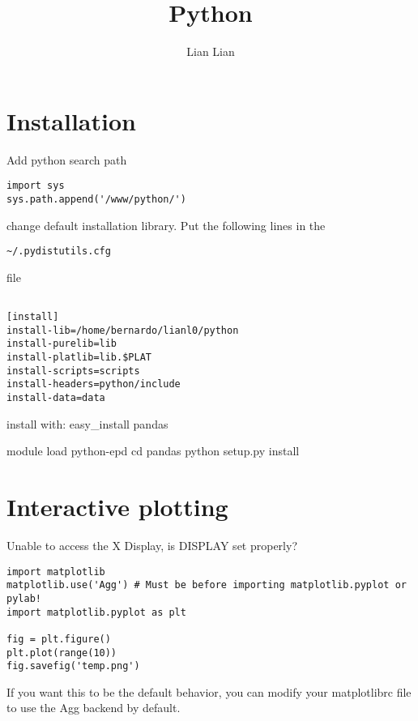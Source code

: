\documentclass[doc,12pt]{article}        %
\title{Python}
\author{Lian Lian}
\begin{document}
\maketitle
\tableofcontents
\section{Installation}
Add python search path
\begin{verbatim}
import sys
sys.path.append('/www/python/')
\end{verbatim}
change default installation library. Put the following lines in the \begin{verbatim}~/.pydistutils.cfg \end{verbatim} file
\begin{verbatim}

[install]
install-lib=/home/bernardo/lianl0/python
install-purelib=lib
install-platlib=lib.$PLAT
install-scripts=scripts
install-headers=python/include
install-data=data
\end{verbatim}
install with:
easy\_install pandas

module load python-epd
cd pandas
python setup.py install

\section{Interactive plotting}
Unable to access the X Display, is DISPLAY set properly?
\begin{verbatim}
import matplotlib
matplotlib.use('Agg') # Must be before importing matplotlib.pyplot or pylab!
import matplotlib.pyplot as plt

fig = plt.figure()
plt.plot(range(10))
fig.savefig('temp.png')
\end{verbatim}
If you want this to be the default behavior, you can modify your matplotlibrc file to use the Agg backend by default.
\end{document}

